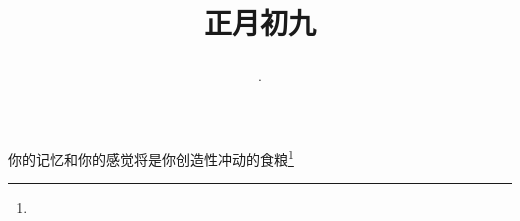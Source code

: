 \title{\date[d=18,m=2,y=2024][year:cn-y,年,month:cn,day:cn,日,·,weekday]·正月初九 }
你的记忆和你的感觉将是你创造性冲动的食粮\footnote{ }

